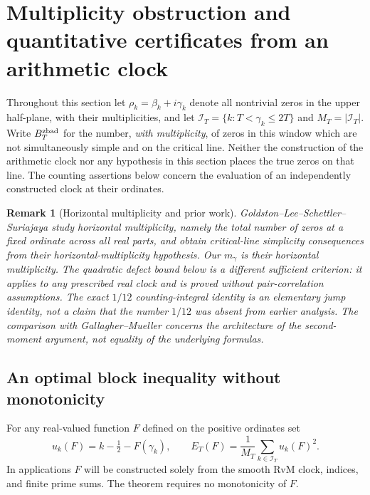 \documentclass[11pt,reqno]{amsart}
\numberwithin{equation}{section}
\newtheorem{remark}[theorem]{Remark}
\begin{document}
\section{Multiplicity obstruction and quantitative certificates from an arithmetic clock}
\label{sec:multiplicity-certificates}

Throughout this section let $\rho_k=\beta_k+i\gamma_k$ denote all nontrivial
zeros in the upper half-plane, with their multiplicities, and let
$\mathcal I_T=\{k:T<\gamma_k\le2T\}$ and $M_T=|\mathcal I_T|$.
Write $B_T^{\rm zbad}$ for the number, \emph{with multiplicity}, of zeros in this window
which are not simultaneously simple and on the critical line.  Neither the
construction of the arithmetic clock nor any hypothesis in this section
places the true zeros on that line.  The counting assertions below concern
the evaluation of an independently constructed clock at their ordinates.

\begin{remark}[Horizontal multiplicity and prior work]
Goldston--Lee--Schettler--Suriajaya
\cite{GLSS2025} study horizontal multiplicity, namely the total number
of zeros at a fixed ordinate across all real parts, and obtain
critical-line simplicity consequences from their horizontal-multiplicity
hypothesis.  Our $m_\gamma$ is their horizontal multiplicity.
The quadratic defect bound below is a different sufficient
criterion: it applies to any prescribed real clock and is proved
without pair-correlation assumptions.  The exact $1/12$
counting-integral identity is an elementary jump identity, not a
claim that the number $1/12$ was absent from earlier analysis.
The comparison with Gallagher--Mueller \cite{GM1978} concerns the
architecture of the second-moment argument, not equality of the
underlying formulas.
\end{remark}

\subsection{An optimal block inequality without monotonicity}
\label{subsec:blockcount}
For any real-valued function $F$ defined on the positive ordinates set
\begin{equation}\label{eq:blockdefect}
  u_k(F)=k-\tfrac12-F(\gamma_k),\qquad
  E_T(F)=\frac1{M_T}\sum_{k\in\mathcal I_T}u_k(F)^2.
\end{equation}
In applications $F$ will be constructed solely from the smooth RvM clock,
indices, and finite prime sums.  The theorem requires no monotonicity of $F$.
\end{document}
